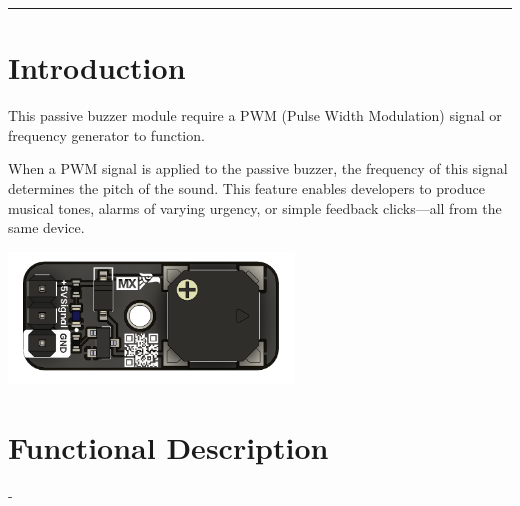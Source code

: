 \documentclass[10pt]{article}
\title{}
\author{}
\date{}
\begin{document}
\noindent
{}
\vspace{1em}
\hrule
\vspace{1.5em}

\section*{Introduction}
\vspace{0.5em}
\noindent
\begin{minipage}[t]{0.62\textwidth}
\setlength{\parskip}{0.75em}
\justifying
This passive buzzer module require a PWM (Pulse Width Modulation) signal or frequency generator to function.

\par

When a PWM signal is applied to the passive buzzer, the frequency of this signal determines the pitch of the sound. This feature enables developers to produce musical tones, alarms of varying urgency, or simple feedback clicks—all from the same device.
\end{minipage}
\hfill
\begin{minipage}[t]{0.35\textwidth}
\centering
\vspace{-0.5em}
\includegraphics[height=3.5cm,keepaspectratio]{./images/product.png}
\end{minipage}

\vspace{1.0em}
\FloatBarrier %



\section*{Functional Description}
-\\ 
\end{document}
